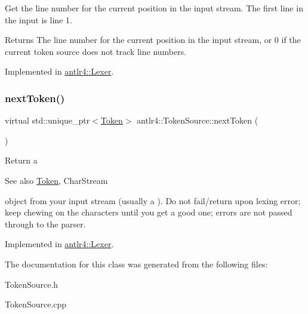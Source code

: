Get the line number for the current position in the input stream. The first line in the input is line 1. 

\begin{DoxyReturn}{Returns}
The line number for the current position in the input stream, or 0 if the current token source does not track line numbers. 
\end{DoxyReturn}


Implemented in \hyperlink{classantlr4_1_1Lexer_a8ecc41ff09e40b469e519ed1b0d0912a}{antlr4\+::\+Lexer}.

\mbox{\label{classantlr4_1_1TokenSource_a41e3a36074ba6dcd3e0dab9250d4b179}} 
\subsubsection{\texorpdfstring{next\+Token()}{nextToken()}}
{\footnotesize\ttfamily virtual std\+::unique\+\_\+ptr$<$\hyperlink{classantlr4_1_1Token}{Token}$>$ antlr4\+::\+Token\+Source\+::next\+Token (\begin{DoxyParamCaption}{ }\end{DoxyParamCaption})\hspace{0.3cm}{\ttfamily [pure virtual]}}

Return a \begin{DoxySeeAlso}{See also}
\hyperlink{classantlr4_1_1Token}{Token}, Char\+Stream


\end{DoxySeeAlso}
object from your input stream (usually a ). Do not fail/return upon lexing error; keep chewing on the characters until you get a good one; errors are not passed through to the parser. 

Implemented in \hyperlink{classantlr4_1_1Lexer_a50ac15500fabb9c3fee8d23af11fdc02}{antlr4\+::\+Lexer}.



The documentation for this class was generated from the following files\+:\begin{DoxyCompactItemize}
\item 
Token\+Source.\+h\item 
Token\+Source.\+cpp\end{DoxyCompactItemize}
